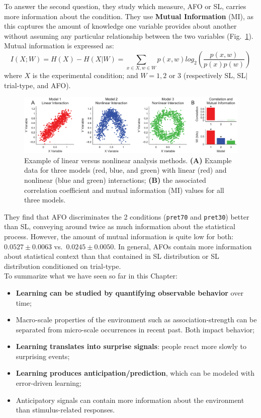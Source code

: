 To answer the second question, they study which measure, AFO or SL, carries more information about the condition. They use \textbf{Mutual Information} (MI), as this captures the amount of knowledge one variable provides about another without assuming any particular relationship between the two variables (Fig.~\ref{fig:timme}). Mutual information is expressed as:
\[
I(X;W) = H(X) - H(X|W) = \sum_{x \in X, w \in W} p(x,w) log_2 \left( \frac{p(x,w)}{p(x)p(w)} \right)
\]
where $X$ is the experimental condition; and $W=1,2\text{ or }3$ (respectively SL, SL$\vert$trial-type, and AFO).

\begin{figure}[!ht]
    \centering
    \captionsetup{width=.8\linewidth}
    \includegraphics[width=0.85\linewidth]{images/timme.png}
    \caption{Example of linear versus nonlinear analysis methods. \textbf{(A)} Example data for three models (red, blue, and green) with linear (red) and nonlinear (blue and green) interactions; \textbf{(B)} the associated correlation coefficient and mutual information (MI) values for all three models.}
    \label{fig:timme}
\end{figure}

They find that AFO discriminates the 2 conditions (\texttt{pret70} and \texttt{pret30}) better than SL, conveying around twice as much information about the statistical process.
However, the amount of mutual information is quite low for both: $0.0527 \pm 0.0063$ vs.~$0.0245 \pm 0.0050$. In general, AFOs contain more information about statistical context than that contained in SL distribution or SL distribution conditioned on trial-type.\\

To summarize what we have seen so far in this Chapter:
\begin{itemize}
    \item \textbf{Learning can be studied by quantifying observable behavior} over time;
    \item Macro-scale properties of the environment such as association-strength can be separated from micro-scale occurrences in recent past. Both impact behavior;
    \item \textbf{Learning translates into surprise signals}: people react more slowly to surprising events;
    \item \textbf{Learning produces anticipation/prediction}, which can be modeled with error-driven learning;
    \item Anticipatory signals can contain more information about the environment than stimulus-related responses.
\end{itemize}

